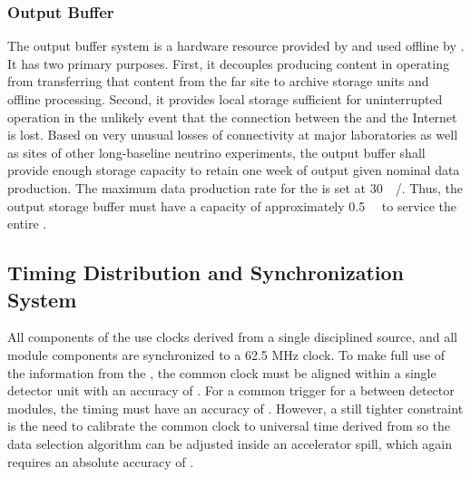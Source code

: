 
\subsubsection{Output Buffer}


The output buffer system is a hardware resource provided by  and used offline by . 
It has two primary purposes. 
First, it decouples producing content in operating  from transferring that content from the far site to archive storage units and offline processing. 
Second, it provides local storage sufficient for uninterrupted  operation in the unlikely event that the connection between the  and the Internet is lost. 
Based on very unusual losses of connectivity at major laboratories as well as  sites of other long-baseline neutrino experiments, the output buffer shall provide enough storage capacity to retain one week of output given nominal data production. 
The maximum data production rate for the  is set at \SI{30}{\peta\byte/\year}. 
Thus, the output storage buffer must have a capacity of approximately \SI{0.5}{\peta\byte} to service the entire .




\subsection{Timing Distribution and Synchronization System}
\label{sec:sp-daq:design-timing}

All components of the  use clocks derived from a single  disciplined source, and all module components are synchronized to a 62.5 MHz clock. 
To make full use of the information from the , the common clock must be aligned within a single detector unit with an accuracy of . 
For a common trigger for a  between detector modules, the timing must have an accuracy of .
However, a still tighter constraint is the need to calibrate the common clock to universal time derived from  so the data selection algorithm can be adjusted inside an accelerator spill, which again requires an absolute accuracy of .


